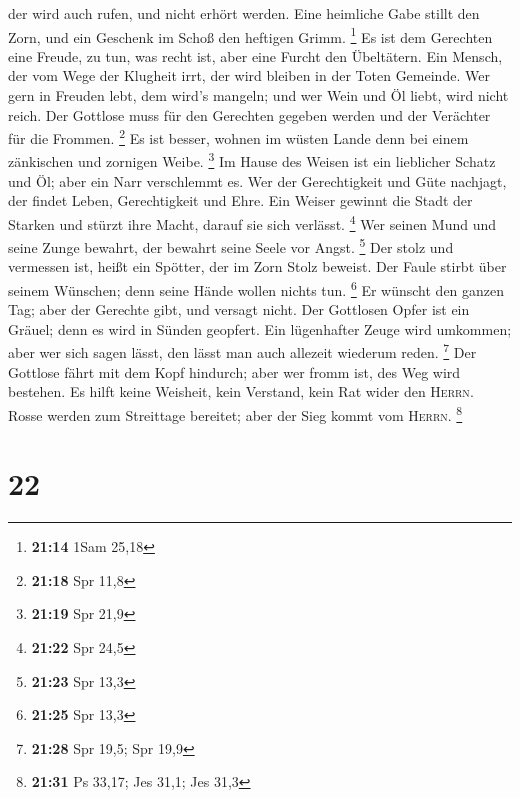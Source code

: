 der wird auch rufen, und nicht erhört werden.  Eine
heimliche Gabe stillt den Zorn, und ein Geschenk im Schoß den heftigen
Grimm. \footnote{\textbf{21:14} 1Sam 25,18}  Es ist dem
Gerechten eine Freude, zu tun, was recht ist, aber eine Furcht den
Übeltätern.  Ein Mensch, der vom Wege der Klugheit irrt,
der wird bleiben in der Toten Gemeinde.  Wer gern in
Freuden lebt, dem wird's mangeln; und wer Wein und Öl liebt, wird nicht
reich.  Der Gottlose muss für den Gerechten gegeben
werden und der Verächter für die Frommen. \footnote{\textbf{21:18} Spr
  11,8}  Es ist besser, wohnen im wüsten Lande denn bei
einem zänkischen und zornigen Weibe. \footnote{\textbf{21:19} Spr 21,9}
 Im Hause des Weisen ist ein lieblicher Schatz und Öl;
aber ein Narr verschlemmt es.  Wer der Gerechtigkeit und
Güte nachjagt, der findet Leben, Gerechtigkeit und Ehre. 
Ein Weiser gewinnt die Stadt der Starken und stürzt ihre Macht, darauf
sie sich verlässt. \footnote{\textbf{21:22} Spr 24,5} 
Wer seinen Mund und seine Zunge bewahrt, der bewahrt seine Seele vor
Angst. \footnote{\textbf{21:23} Spr 13,3}  Der stolz und
vermessen ist, heißt ein Spötter, der im Zorn Stolz beweist.
 Der Faule stirbt über seinem Wünschen; denn seine Hände
wollen nichts tun. \footnote{\textbf{21:25} Spr 13,3}  Er
wünscht den ganzen Tag; aber der Gerechte gibt, und versagt nicht.
 Der Gottlosen Opfer ist ein Gräuel; denn es wird in
Sünden geopfert.  Ein lügenhafter Zeuge wird umkommen;
aber wer sich sagen lässt, den lässt man auch allezeit wiederum reden.
\footnote{\textbf{21:28} Spr 19,5; Spr 19,9}  Der
Gottlose fährt mit dem Kopf hindurch; aber wer fromm ist, des Weg wird
bestehen.  Es hilft keine Weisheit, kein Verstand, kein
Rat wider den \textsc{Herrn}.  Rosse werden zum
Streittage bereitet; aber der Sieg kommt vom \textsc{Herrn}. \footnote{\textbf{21:31}
  Ps 33,17; Jes 31,1; Jes 31,3}

\hypertarget{section-9}{%
\section{22}\label{section-9}}

